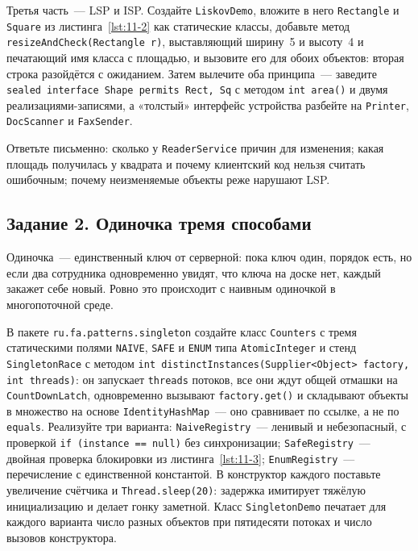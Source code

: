 Третья часть~--- LSP и ISP. Создайте \texttt{LiskovDemo}, вложите в него
\texttt{Rectangle} и \texttt{Square} из листинга~\ref{lst:11-2} как статические
классы, добавьте метод \texttt{resizeAndCheck(Rectangle r)}, выставляющий
ширину~5 и высоту~4 и печатающий имя класса с площадью, и вызовите его для обоих
объектов: вторая строка разойдётся с ожиданием. Затем вылечите оба принципа~---
заведите \texttt{sealed interface Shape permits Rect, Sq} с методом
\texttt{int area()} и двумя реализациями-записями, а «толстый» интерфейс
устройства разбейте на \texttt{Printer}, \texttt{DocScanner} и
\texttt{FaxSender}.

Ответьте письменно: сколько у \texttt{ReaderService} причин для изменения; какая
площадь получилась у квадрата и почему клиентский код нельзя считать ошибочным;
почему неизменяемые объекты реже нарушают LSP.

\subsection*{Задание 2. Одиночка тремя способами}

Одиночка~--- единственный ключ от серверной: пока ключ один, порядок есть, но
если два сотрудника одновременно увидят, что ключа на доске нет, каждый закажет
себе новый. Ровно это происходит с наивным одиночкой в многопоточной среде.

В пакете \texttt{ru.fa.patterns.singleton} создайте класс \texttt{Counters} с
тремя статическими полями \texttt{NAIVE}, \texttt{SAFE} и \texttt{ENUM} типа
\texttt{AtomicInteger} и стенд \texttt{SingletonRace} с методом
\texttt{int distinctInstances(Supplier<Object> factory, int threads)}: он
запускает \texttt{threads} потоков, все они ждут общей отмашки на
\texttt{CountDownLatch}, одновременно вызывают \texttt{factory.get()} и
складывают объекты в множество на основе \texttt{IdentityHashMap}~--- оно
сравнивает по ссылке, а не по \texttt{equals}. Реализуйте три варианта:
\texttt{NaiveRegistry}~--- ленивый и небезопасный, с проверкой
\texttt{if (instance == null)} без синхронизации; \texttt{SafeRegistry}~---
двойная проверка блокировки из листинга~\ref{lst:11-3};
\texttt{EnumRegistry}~--- перечисление с единственной константой. В конструктор
каждого поставьте увеличение счётчика и \texttt{Thread.sleep(20)}: задержка
имитирует тяжёлую инициализацию и делает гонку заметной. Класс
\texttt{SingletonDemo} печатает для каждого варианта число разных объектов при
пятидесяти потоках и число вызовов конструктора.

